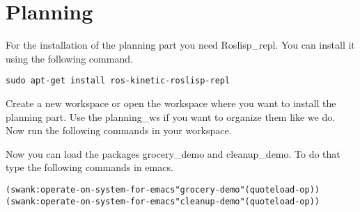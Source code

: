 \documentclass[main.tex]{subfiles}
\begin{document}
	\section{Planning}
	\label{sec:Planning}
	For the installation of the planning part you need Roslisp\_repl.
	You can install it using the following command.
	\begin{lstlisting}
sudo apt-get install ros-kinetic-roslisp-repl 
\end{lstlisting}

	Create a new workspace or open the workspace where you want to install the planning part. Use the planning\_ws if you want to organize them like we do. Now run the following commands in your workspace.\\
\begin{mdframed}[backgroundcolor=mygray, rightline=false]

\end{mdframed}
	
	Now you can load the packages grocery\_demo and cleanup\_demo.
	To do that type the following commands in emacs.
	\begin{lstlisting}
(swank:operate-on-system-for-emacs"grocery-demo"(quoteload-op))
(swank:operate-on-system-for-emacs"cleanup-demo"(quoteload-op)) 
\end{lstlisting}
	
\end{document}
